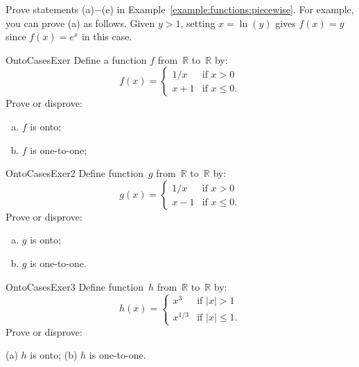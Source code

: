 \begin{exercise}{}
Prove statements (a)$-$(e) in Example~\ref{example:functions:piecewise}.  For example, you can prove (a)  as follows. Given $y>1$, setting $x = \ln(y)$ gives $f(x) = y$ since $f(x) = e^x$ in this case. 
\end{exercise}

\begin{exercise}{OntoCasesExer} \label{OntoCasesExer}
 Define a function $f$  from~$\mathbb{R}$ to~$\mathbb{R}$ by:
$$ f(x) = 
\begin{cases}
1/x & \mbox{if $x > 0$} \\
x + 1 & \mbox{if $x \le 0$.}
\end{cases} $$
Prove or disprove:
\begin{multicols}{2}
 \begin{enumerate}[(a)]
 \item \label{OntoCasesExer-fOnto}
 $f$ is onto;
 \item \label{OntoCasesExer-fNot11}
 $f$ is one-to-one;
\end{enumerate}
\end{multicols}
\end{exercise}

\begin{exercise}{OntoCasesExer2} \label{OntoCasesExer2}
 Define function~$g$ from~$\mathbb{R}$ to~$\mathbb{R}$ by:
$$ g(x) = 
\begin{cases}
1/x & \mbox{if $x > 0$} \\
x - 1 & \mbox{if $x \le 0$}
 . \end{cases} $$
Prove or disprove:
\begin{multicols}{2}
 \begin{enumerate}[(a)]
 \item \label{OntoCasesExer-gNotOnto}
 $g$ is onto;
 \item \label{OntoCasesExer-g11} 
 $g$ is one-to-one.
\end{enumerate}
\end{multicols}
\end{exercise}

\begin{exercise}{OntoCasesExer3} \label{OntoCasesExer3}
 Define function~$h$ from~$\mathbb{R}$ to~$\mathbb{R}$ by:
$$ h(x) = 
\begin{cases}
x^{3} & \mbox{if $|x| > 1$} \\
x^{1/3} & \mbox{if $|x| \le 1$}
 . \end{cases} $$
Prove or disprove:

(a) \qquad  $h$ is onto; \qquad \qquad (b)  $h$ is one-to-one.
\end{exercise}


